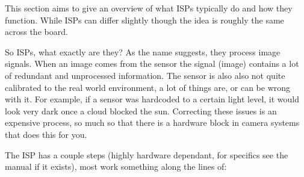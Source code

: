 This section aims to give an overview of what ISPs typically do and how they
function. While ISPs can differ slightly though the idea is roughly the same
across the board.

So ISPs, what exactly are they? As the name suggests, they process image
signals. When an image comes from the sensor the signal (image) contains a lot
of redundant and unprocessed information. The sensor is also also not quite
calibrated to the real world environment, a lot of things are, or can be wrong
with it. For example, if a sensor was hardcoded to a certain light level, it
would look very dark once a cloud blocked the sun. Correcting these issues is
an expensive process, so much so that there is a hardware block in camera
systems that does this for you.

The ISP has a couple steps (highly hardware dependant, for specifics see the
manual if it exists), most work something along the lines of:

